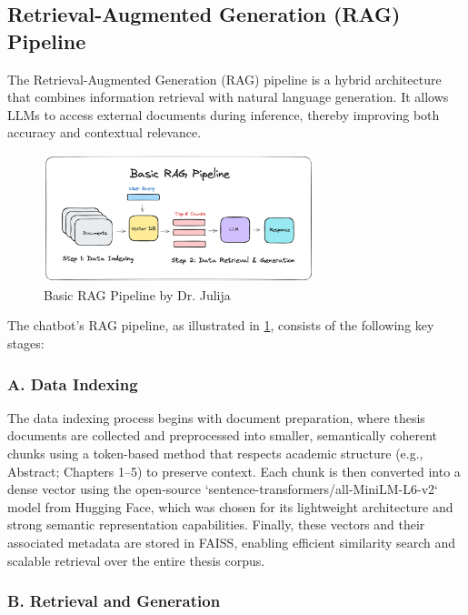 \begin{refsection}
\subsection{Retrieval-Augmented Generation (RAG) Pipeline}

The Retrieval-Augmented Generation (RAG) pipeline is a hybrid architecture that combines information retrieval with natural language generation. It allows LLMs to access external documents during inference, thereby improving both accuracy and contextual relevance.

\begin{figure}[htbp]
    \centering
    \includegraphics[width=0.7\textwidth]{figures/rag.png}
    \caption{Basic RAG Pipeline by Dr. Julija}
    \label{fig:rag}
\end{figure}

The chatbot’s RAG pipeline, as illustrated in \ref{fig:rag}, consists of the following key stages:

\subsubsection{A. Data Indexing}

The data indexing process begins with document preparation, where thesis documents are collected and preprocessed into smaller, semantically coherent chunks using a token-based method that respects academic structure (e.g., Abstract; Chapters 1–5) to preserve context. Each chunk is then converted into a dense vector using the open-source `sentence-transformers/all-MiniLM-L6-v2` model from Hugging Face, which was chosen for its lightweight architecture and strong semantic representation capabilities. Finally, these vectors and their associated metadata are stored in FAISS, enabling efficient similarity search and scalable retrieval over the entire thesis corpus.

\subsubsection{B. Retrieval and Generation}


\end{refsection}
